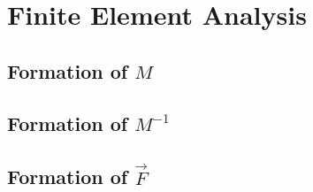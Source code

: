 \section{Finite Element Analysis}




\subsection{Formation of $M$}
\subsection{Formation of $M^{-1}$}
\subsection{Formation of $\vec{F}$}
